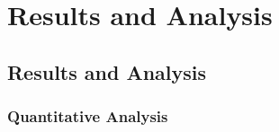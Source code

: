 
\chapter{Results and Analysis} %

\label{c5} %


\section{Results and Analysis}

\subsection{Quantitative Analysis}



